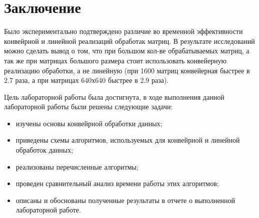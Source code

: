 \chapter*{Заключение}

Было экспериментально подтверждено различие во временной эффективности конвейрной и линейной реализаций обработак матриц. В результате исследований можно сделать вывод о том, что при большом кол-ве обрабатываемых матриц, а так же при матрицах большого размера стоит использовать конвейерную реализацию обработки, а не линейную (при 1600 матриц конвейерная быстрее в 2.7 раза, а при матрицах 640х640 быстрее в 2.9 раза).

Цель лабораторной работы была достигнута, в ходе выполнения данной лабораторной работы были решены следующие задачи:
\begin{itemize}[label=---]
	\item изучены основы конвейрной обработки данных;
	\item приведены схемы алгоритмов, используемых для конвейрной и линейной обработок данных;
	\item реализованы перечисленные алгоритмы;
	\item проведен сравнительный анализ времени работы этих алгоритмов;
	\item описаны и обоснованы полученные результаты в отчете о выполненной лабораторной работе.
\end{itemize}